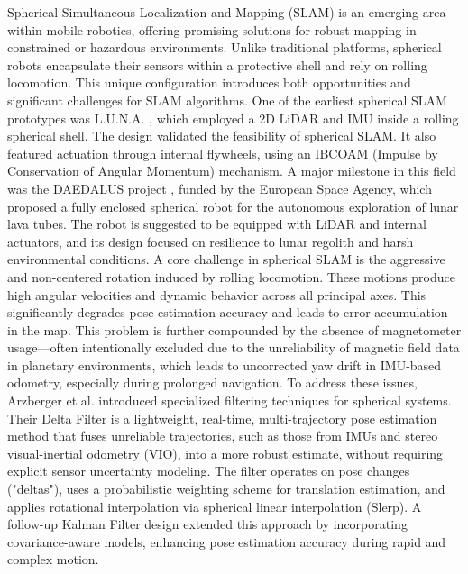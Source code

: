 \documentclass[conference]{IEEEtran}
\begin{document}
Spherical Simultaneous Localization and Mapping (SLAM) is an emerging area within mobile robotics, offering promising solutions for robust mapping in constrained or hazardous environments. 
Unlike traditional platforms, spherical robots encapsulate their sensors within a protective shell and rely on rolling locomotion. 
This unique configuration introduces both opportunities and significant challenges for SLAM algorithms. 
One of the earliest spherical SLAM prototypes was L.U.N.A. \cite{luna} , which employed a 2D LiDAR and IMU inside a rolling spherical shell. 
The design validated the feasibility of spherical SLAM. 
It also featured actuation through internal flywheels, using an IBCOAM (Impulse by Conservation of Angular Momentum) mechanism.
A major milestone in this field was the DAEDALUS project \cite{DAEDALUS}, funded by the European Space Agency, which proposed a fully enclosed spherical robot for the autonomous exploration of lunar lava tubes. 
The robot is suggested to be equipped with LiDAR and internal actuators, and its design focused on resilience to lunar regolith and harsh environmental conditions.
A core challenge in spherical SLAM is the aggressive and non-centered rotation induced by rolling locomotion. 
These motions produce high angular velocities and dynamic behavior across all principal axes. 
This significantly degrades pose estimation accuracy and leads to error accumulation in the map. 
This problem is further compounded by the absence of magnetometer usage—often intentionally excluded due to the unreliability of magnetic field data in planetary environments, which leads to uncorrected yaw drift in IMU-based odometry, especially during prolonged navigation.
To address these issues, Arzberger et al. \cite{Kalman_filter_sphere,sphere_Fabi_1,DeltaFilter} introduced specialized filtering techniques for spherical systems. 
Their Delta Filter is a lightweight, real-time, multi-trajectory pose estimation method that fuses unreliable trajectories, such as those from IMUs and stereo visual-inertial odometry (VIO), into a more robust estimate, without requiring explicit sensor uncertainty modeling. 
The filter operates on pose changes ("deltas"), uses a probabilistic weighting scheme for translation estimation, and applies rotational interpolation via spherical linear interpolation (Slerp). 
A follow-up Kalman Filter design extended this approach by incorporating covariance-aware models, enhancing pose estimation accuracy during rapid and complex motion.
\end{document}
